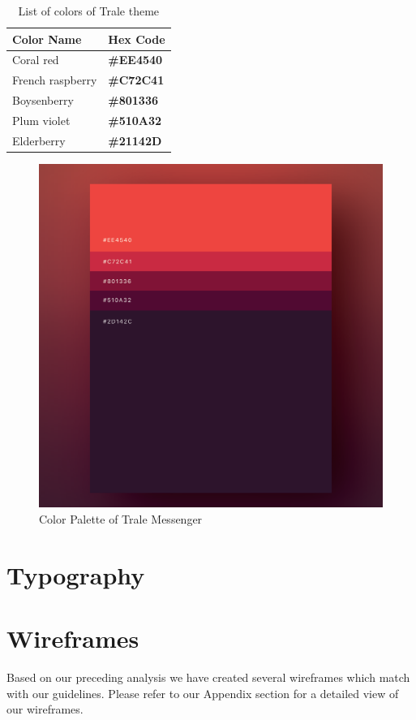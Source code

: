 \begin{table}[hb]
    \centering
    \begin{tabular}{|l|l|}
        \hline
        \textbf{Color Name} & \textbf{Hex Code}\\ \hline
        Coral red & \color[HTML]{EE4540}\textbf{\#EE4540} \\ \hline
        French raspberry & \color[HTML]{C72C41}\textbf{\#C72C41} \\ \hline
        Boysenberry & \color[HTML]{801336}\textbf{\#801336} \\ \hline
        Plum violet & \color[HTML]{510A32}\textbf{\#510A32} \\ \hline
        Elderberry & \color[HTML]{21142D}\textbf{\#21142D} \\ \hline
    \end{tabular}
    \caption{List of colors of Trale theme}
    \label{tab:colorTable}
\end{table}

\begin{figure}
    \centering
    \includegraphics[width=1.0\textwidth]{./images/colorPalette.png}
    \caption{Color Palette of Trale Messenger}
    \label{fig:colorPalette}
\end{figure}

\section{Typography}\label{sec:typography}

\section{Wireframes}\label{sec:wireframes}

Based on our preceding analysis we have created several wireframes which match with our guidelines.
Please refer to our Appendix section for a detailed view of our wireframes. %
